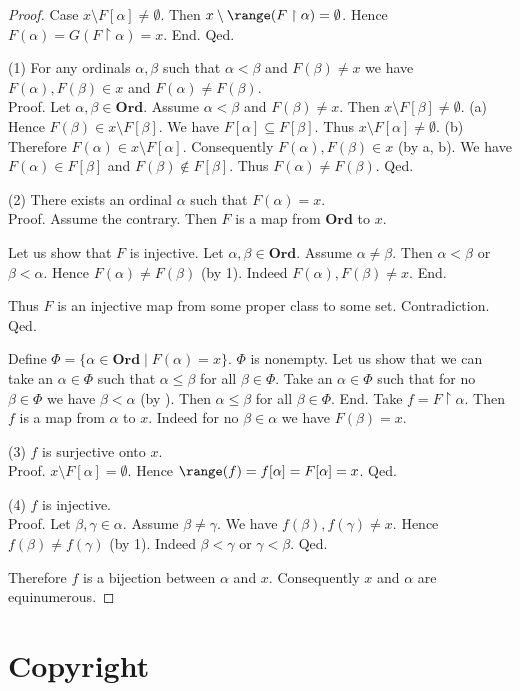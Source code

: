 \documentclass{article}
\newcommand\Ord{\textbf{Ord}}
\begin{document}
\begin{forthel}
\begin{proof}
        Case $x \setminus F[\alpha] \neq \emptyset$.
          Then $x \setminus \range(F \restriction \alpha) = \emptyset$.
          Hence $F(\alpha)
            = G(F \restriction \alpha)
            = x$.
        End.
      Qed.

      (1) For any ordinals $\alpha, \beta$ such that $\alpha < \beta$ and $F(\beta) \neq x$ we have $F(\alpha), F(\beta) \in x$ and $F(\alpha) \neq F(\beta)$. \\
      Proof.
        Let $\alpha, \beta \in \Ord$.
        Assume $\alpha < \beta$ and $F(\beta) \neq x$.
        Then $x \setminus F[\beta] \neq \emptyset$.
        (a) Hence $F(\beta) \in x \setminus F[\beta]$.
        We have $F[\alpha] \subseteq F[\beta]$.
        Thus $x \setminus F[\alpha] \neq \emptyset$.
        (b) Therefore $F(\alpha) \in x \setminus F[\alpha]$.
        Consequently $F(\alpha), F(\beta) \in x$ (by a, b).
        We have $F(\alpha) \in F[\beta]$ and $F(\beta) \notin F[\beta]$.
        Thus $F(\alpha) \neq F(\beta)$.
      Qed.

      (2) There exists an ordinal $\alpha$ such that $F(\alpha) = x$. \\
      Proof.
        Assume the contrary.
        Then $F$ is a map from $\Ord$ to $x$.

        Let us show that $F$ is injective.
          Let $\alpha, \beta \in \Ord$.
          Assume $\alpha \neq \beta$.
          Then $\alpha < \beta$ or $\beta < \alpha$.
          Hence $F(\alpha) \neq F(\beta)$ (by 1).
          Indeed $F(\alpha), F(\beta) \neq x$.
        End.

        Thus $F$ is an injective map from some proper class to some set.
        Contradiction.
      Qed.

      Define $\Phi = \{ \alpha \in \Ord \mid F(\alpha) = x \}$.
      $\Phi$ is nonempty.
      Let us show that we can take an $\alpha \in \Phi$ such that $\alpha \leq \beta$ for all $\beta \in \Phi$.
        Take an $\alpha \in \Phi$ such that for no $\beta \in \Phi$ we have $\beta < \alpha$ (by ).
        Then $\alpha \leq \beta$ for all $\beta \in \Phi$.
      End.
      Take $f = F \restriction \alpha$.
      Then $f$ is a map from $\alpha$ to $x$.
      Indeed for no $\beta \in \alpha$ we have $F(\beta) = x$.

      (3) $f$ is surjective onto $x$. \\
      Proof.
        $x \setminus F[\alpha] = \emptyset$.
        Hence $\range(f)
          = f[\alpha]
          = F[\alpha]
          = x$.
      Qed.

      (4) $f$ is injective. \\
      Proof.
        Let $\beta, \gamma \in \alpha$.
        Assume $\beta \neq \gamma$.
        We have $f(\beta), f(\gamma) \neq x$.
        Hence $f(\beta) \neq f(\gamma)$ (by 1).
        Indeed $\beta < \gamma$ or $\gamma < \beta$.
      Qed.

      Therefore $f$ is a bijection between $\alpha$ and $x$.
      Consequently $x$ and $\alpha$ are equinumerous.
    \end{proof}
  \end{forthel}

  \printbibliography

  \section*{Copyright}
  \doclicenseThis
\end{document}
